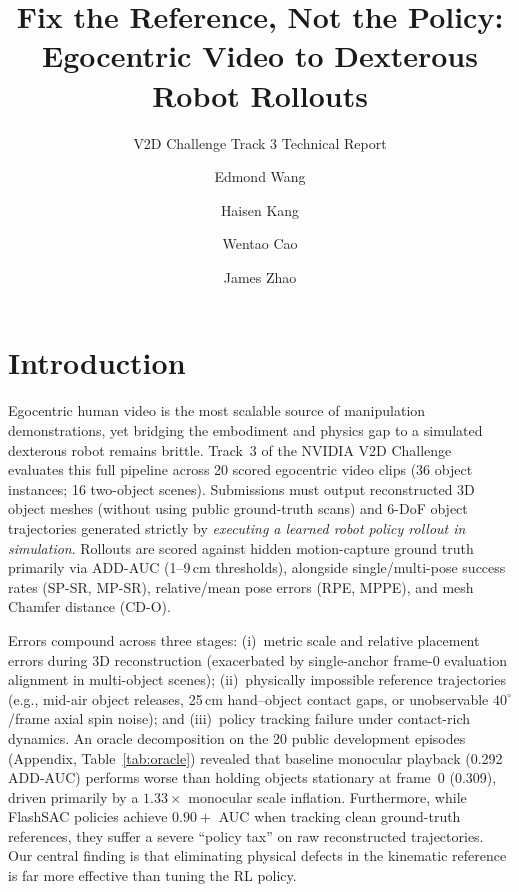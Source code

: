 \documentclass[10pt]{nvidiaextabstract}
\title{Fix the Reference, Not the Policy: Egocentric Video to Dexterous Robot Rollouts}
\subtitle{V2D Challenge Track 3 Technical Report}
\author[1*]{Edmond Wang}
\author[1*]{Haisen Kang}
\author[1*]{Wentao Cao}
\author[1*]{James Zhao}
\author[1]{\todo{Add remaining authors or remove}}
\affil[1]{Carnegie Mellon University}
\affil[ ]{\texttt{\{edmondwa, haisenk, wentaoc, jameszh2\}@andrew.cmu.edu}}
\begin{document}
\maketitle

\section{Introduction}
\label{sec:intro}

Egocentric human video is the most scalable source of manipulation demonstrations, yet bridging the embodiment and physics gap to a simulated dexterous robot remains brittle. Track~3 of the NVIDIA V2D Challenge~\cite{v2d,v2ddata} evaluates this full pipeline across 20 scored egocentric video clips (36 object instances; 16 two-object scenes). Submissions must output reconstructed 3D object meshes (without using public ground-truth scans) and 6-DoF object trajectories generated strictly by \emph{executing a learned robot policy rollout in simulation}. Rollouts are scored against hidden motion-capture ground truth primarily via ADD-AUC (1--9\,cm thresholds), alongside single/multi-pose success rates (SP-SR, MP-SR), relative/mean pose errors (RPE, MPPE), and mesh Chamfer distance (CD-O).

Errors compound across three stages: (i)~metric scale and relative placement errors during 3D reconstruction (exacerbated by single-anchor frame-0 evaluation alignment in multi-object scenes); (ii)~physically impossible reference trajectories (e.g., mid-air object releases, 25\,cm hand--object contact gaps, or unobservable $40^\circ$/frame axial spin noise); and (iii)~policy tracking failure under contact-rich dynamics. An oracle decomposition on the 20 public development episodes (Appendix, Table~\ref{tab:oracle}) revealed that baseline monocular playback (0.292 ADD-AUC) performs worse than holding objects stationary at frame~0 (0.309), driven primarily by a $1.33\times$ monocular scale inflation. Furthermore, while FlashSAC policies achieve $0.90+$ AUC when tracking clean ground-truth references, they suffer a severe ``policy tax'' on raw reconstructed trajectories. Our central finding is that eliminating physical defects in the kinematic reference is far more effective than tuning the RL policy.
\end{document}
